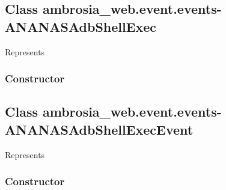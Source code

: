 \documentclass[letterpaper,10pt,english]{sphinxmanual}
\begin{document}
\subsection{Class ambrosia\_web.event.events-ANANASAdbShellExec}
\label{ambrosia_web.event.events-ANANASAdbShellExec:class-ambrosia-web-event-events-ananasadbshellexec}\label{ambrosia_web.event.events-ANANASAdbShellExec::doc}
Represents 


\subsubsection{Constructor}
\label{ambrosia_web.event.events-ANANASAdbShellExec:constructor}

\begin{fulllineitems}
\label{ambrosia_web.event.events-ANANASAdbShellExec:ambrosia_web.event.events-ANANASAdbShellExec}
\end{fulllineitems}



\subsection{Class ambrosia\_web.event.events-ANANASAdbShellExecEvent}
\label{ambrosia_web.event.events-ANANASAdbShellExecEvent:class-ambrosia-web-event-events-ananasadbshellexecevent}\label{ambrosia_web.event.events-ANANASAdbShellExecEvent::doc}
Represents {\hyperref[ambrosia_plugins.lkm:ambrosia_plugins.lkm.events.ANANASAdbShellExecEvent]{}}


\subsubsection{Constructor}
\label{ambrosia_web.event.events-ANANASAdbShellExecEvent:constructor}

\begin{fulllineitems}
\label{ambrosia_web.event.events-ANANASAdbShellExecEvent:ambrosia_web.event.events-ANANASAdbShellExecEvent}
\end{fulllineitems}
\end{document}

